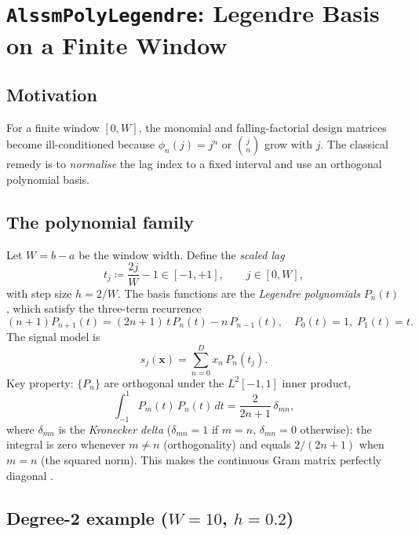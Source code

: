 \documentclass[11pt, a4paper]{article}
\theoremstyle{definition}
\newcommand{\vx}{\bm{x}}
\newcommand{\defeq}{\coloneqq}
\begin{document}
\section{\texttt{AlssmPolyLegendre}: Legendre Basis on a Finite Window}
\label{sec:legendre}

\subsection{Motivation}

For a finite window $[0, W]$, the monomial and falling-factorial design
matrices become ill-conditioned because $\phi_n(j) = j^n$ or
$\binom{j}{n}$ grow with $j$. The classical remedy is to \emph{normalise}
the lag index to a fixed interval and use an orthogonal polynomial basis.

\subsection{The polynomial family}

Let $W = b - a$ be the window width. Define the \emph{scaled lag}
\begin{equation}
  t_j \defeq \frac{2j}{W} - 1 \in [-1,+1], \qquad j \in [0, W],
  \label{eq:tsc}
\end{equation}
with step size $h = 2/W$.  The basis functions are the \emph{Legendre
polynomials} $P_n(t)$, which satisfy the three-term recurrence
\begin{equation}
  (n+1)P_{n+1}(t) = (2n+1)\,t\,P_n(t) - n\,P_{n-1}(t),
  \quad P_0(t)=1,\; P_1(t)=t.
  \label{eq:legendre3term}
\end{equation}
The signal model is
\begin{equation}
  s_j(\vx) = \sum_{n=0}^{D} x_n\, P_n(t_j).
\end{equation}
Key property: $\{P_n\}$ are orthogonal under the $L^2[-1,1]$ inner product,
\[
  \int_{-1}^{1} P_m(t)\,P_n(t)\,dt = \frac{2}{2n+1}\,\delta_{mn},
\]
where $\delta_{mn}$ is the \emph{Kronecker delta} ($\delta_{mn}=1$ if $m=n$,
$\delta_{mn}=0$ otherwise): the integral is zero whenever $m \neq n$
(orthogonality) and equals $2/(2n+1)$ when $m=n$ (the squared norm).
This makes the continuous Gram matrix perfectly diagonal
\cite{Abramowitz1972, DLMF}.

\subsection{Degree-2 example ($W=10$, $h=0.2$)}
\end{document}
